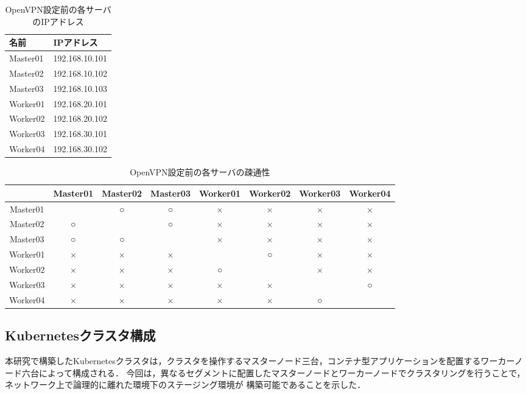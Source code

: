 \begin{table}[htb]
  \begin{center}
    \caption{OpenVPN設定前の各サーバのIPアドレス}
    \begin{tabular}{|l|l|} \hline
      名前 & IPアドレス \\ \hline
      Master01 & 192.168.10.101 \\ \hline
      Master02 & 192.168.10.102 \\ \hline
      Master03 & 192.168.10.103 \\ \hline
      Worker01 & 192.168.20.101 \\ \hline
      Worker02 & 192.168.20.102 \\ \hline
      Worker03 & 192.168.30.101 \\ \hline
      Worker04 & 192.168.30.102 \\ \hline
    \end{tabular}
  \end{center}
\end{table}

\begin{table}[htb]
  \begin{center}
    \caption{OpenVPN設定前の各サーバの疎通性}
    \begin{tabular}{|c|c|c|c|c|c|c|c|} \hline
      & Master01 & Master02 & Master03 & Worker01 & Worker02 & Worker03 & Worker04 \\ \hline
      Master01 & \ & ○ & ○ & × & × & × & × \\ \hline
      Master02 & ○ & \ & ○ & × & × & × & × \\ \hline
      Master03 & ○ & ○ & \ & × & × & × & × \\ \hline
      Worker01 & × & × & × & \ & ○ & × & × \\ \hline
      Worker02 & × & × & × & ○ & \ & × & × \\ \hline
      Worker03 & × & × & × & × & × & \ & ○ \\ \hline
      Worker04 & × & × & × & × & × & ○ & \ \\ \hline
    \end{tabular}
  \end{center}
\end{table}

\subsection{Kubernetesクラスタ構成}
\label{implementation:kubernetes-environment}
本研究で構築したKubernetesクラスタは，クラスタを操作するマスターノード三台，コンテナ型アプリケーションを配置するワーカーノード六台によって構成される．
今回は，異なるセグメントに配置したマスターノードとワーカーノードでクラスタリングを行うことで，ネットワーク上で論理的に離れた環境下のステージング環境が
構築可能であることを示した．

